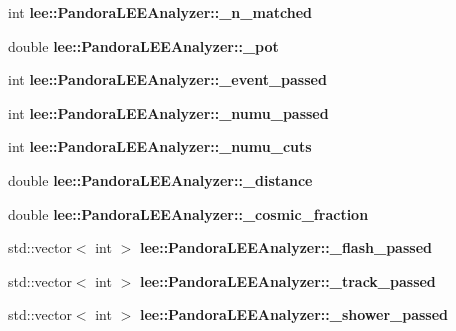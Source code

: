 \begin{DoxyCompactItemize}
\item 
\hypertarget{group__lee_ga49bf84147aebe0125c041e58ad39ea63}{int {\bfseries lee\-::\-Pandora\-L\-E\-E\-Analyzer\-::\-\_\-n\-\_\-matched}}\label{group__lee_ga49bf84147aebe0125c041e58ad39ea63}

\item 
\hypertarget{group__lee_gab9e2d69bbb1796181bfb0b73b3571327}{double {\bfseries lee\-::\-Pandora\-L\-E\-E\-Analyzer\-::\-\_\-pot}}\label{group__lee_gab9e2d69bbb1796181bfb0b73b3571327}

\item 
\hypertarget{group__lee_gae2220a696ef93026eca209bb981ffbdd}{int {\bfseries lee\-::\-Pandora\-L\-E\-E\-Analyzer\-::\-\_\-event\-\_\-passed}}\label{group__lee_gae2220a696ef93026eca209bb981ffbdd}

\item 
\hypertarget{group__lee_ga5358fd908f314be50f85ea97523fbca4}{int {\bfseries lee\-::\-Pandora\-L\-E\-E\-Analyzer\-::\-\_\-numu\-\_\-passed}}\label{group__lee_ga5358fd908f314be50f85ea97523fbca4}

\item 
\hypertarget{group__lee_ga50ca292dbf6464fa2845f4aed51f79b7}{int {\bfseries lee\-::\-Pandora\-L\-E\-E\-Analyzer\-::\-\_\-numu\-\_\-cuts}}\label{group__lee_ga50ca292dbf6464fa2845f4aed51f79b7}

\item 
\hypertarget{group__lee_ga67ddd5bec66667568bc59b0dfa13839a}{double {\bfseries lee\-::\-Pandora\-L\-E\-E\-Analyzer\-::\-\_\-distance}}\label{group__lee_ga67ddd5bec66667568bc59b0dfa13839a}

\item 
\hypertarget{group__lee_ga9d3deef73e6dd40b958cb4709ddea35c}{double {\bfseries lee\-::\-Pandora\-L\-E\-E\-Analyzer\-::\-\_\-cosmic\-\_\-fraction}}\label{group__lee_ga9d3deef73e6dd40b958cb4709ddea35c}

\item 
\hypertarget{group__lee_ga39d4c9760193a606cfdeb7af7195486c}{std\-::vector$<$ int $>$ {\bfseries lee\-::\-Pandora\-L\-E\-E\-Analyzer\-::\-\_\-flash\-\_\-passed}}\label{group__lee_ga39d4c9760193a606cfdeb7af7195486c}

\item 
\hypertarget{group__lee_ga222f64bba75838505ac948638260ed6b}{std\-::vector$<$ int $>$ {\bfseries lee\-::\-Pandora\-L\-E\-E\-Analyzer\-::\-\_\-track\-\_\-passed}}\label{group__lee_ga222f64bba75838505ac948638260ed6b}

\item 
\hypertarget{group__lee_ga677892512d8f61dd3783e04b2522925f}{std\-::vector$<$ int $>$ {\bfseries lee\-::\-Pandora\-L\-E\-E\-Analyzer\-::\-\_\-shower\-\_\-passed}}\label{group__lee_ga677892512d8f61dd3783e04b2522925f}


\end{DoxyCompactItemize}
